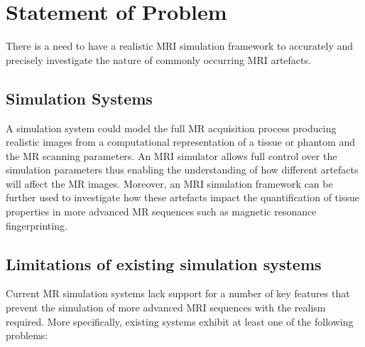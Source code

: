 \section{Statement of Problem}\label{chapterlabel1sec1}
There is a need to have a realistic MRI simulation framework to accurately and precisely investigate the nature of commonly occurring MRI artefacts.

\subsection{Simulation Systems}
A simulation system could model the full MR acquisition process producing realistic images from a computational representation of a tissue or phantom and the MR scanning parameters.
An MRI simulator allows full control over the simulation parameters thus enabling the understanding of how different artefacts will affect the MR images.
Moreover, an MRI simulation framework can be further used to investigate how these artefacts impact the quantification of tissue properties in more advanced MR sequences such as magnetic resonance fingerprinting.

\subsection{Limitations of existing simulation systems}
Current MR simulation systems lack support for a number of key features that prevent the simulation of more advanced MRI sequences with the realism required. 
More specifically, existing systems exhibit at least one of the following problems:

